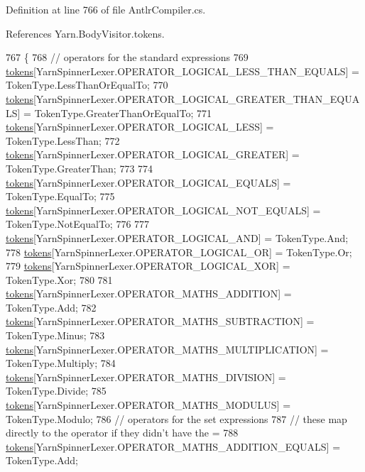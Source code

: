 Definition at line 766 of file Antlr\-Compiler.\-cs.



References Yarn.\-Body\-Visitor.\-tokens.


\begin{DoxyCode}
767         \{
768             \textcolor{comment}{// operators for the standard expressions}
769             \hyperlink{a00038_ab8aa4dbe47a807e3d973df2b85e3fffc}{tokens}[YarnSpinnerLexer.OPERATOR\_LOGICAL\_LESS\_THAN\_EQUALS] = TokenType.LessThanOrEqualTo;
770             \hyperlink{a00038_ab8aa4dbe47a807e3d973df2b85e3fffc}{tokens}[YarnSpinnerLexer.OPERATOR\_LOGICAL\_GREATER\_THAN\_EQUALS] = 
      TokenType.GreaterThanOrEqualTo;
771             \hyperlink{a00038_ab8aa4dbe47a807e3d973df2b85e3fffc}{tokens}[YarnSpinnerLexer.OPERATOR\_LOGICAL\_LESS] = TokenType.LessThan;
772             \hyperlink{a00038_ab8aa4dbe47a807e3d973df2b85e3fffc}{tokens}[YarnSpinnerLexer.OPERATOR\_LOGICAL\_GREATER] = TokenType.GreaterThan;
773 
774             \hyperlink{a00038_ab8aa4dbe47a807e3d973df2b85e3fffc}{tokens}[YarnSpinnerLexer.OPERATOR\_LOGICAL\_EQUALS] = TokenType.EqualTo;
775             \hyperlink{a00038_ab8aa4dbe47a807e3d973df2b85e3fffc}{tokens}[YarnSpinnerLexer.OPERATOR\_LOGICAL\_NOT\_EQUALS] = TokenType.NotEqualTo;
776 
777             \hyperlink{a00038_ab8aa4dbe47a807e3d973df2b85e3fffc}{tokens}[YarnSpinnerLexer.OPERATOR\_LOGICAL\_AND] = TokenType.And;
778             \hyperlink{a00038_ab8aa4dbe47a807e3d973df2b85e3fffc}{tokens}[YarnSpinnerLexer.OPERATOR\_LOGICAL\_OR] = TokenType.Or;
779             \hyperlink{a00038_ab8aa4dbe47a807e3d973df2b85e3fffc}{tokens}[YarnSpinnerLexer.OPERATOR\_LOGICAL\_XOR] = TokenType.Xor;
780 
781             \hyperlink{a00038_ab8aa4dbe47a807e3d973df2b85e3fffc}{tokens}[YarnSpinnerLexer.OPERATOR\_MATHS\_ADDITION] = TokenType.Add;
782             \hyperlink{a00038_ab8aa4dbe47a807e3d973df2b85e3fffc}{tokens}[YarnSpinnerLexer.OPERATOR\_MATHS\_SUBTRACTION] = TokenType.Minus;
783             \hyperlink{a00038_ab8aa4dbe47a807e3d973df2b85e3fffc}{tokens}[YarnSpinnerLexer.OPERATOR\_MATHS\_MULTIPLICATION] = TokenType.Multiply;
784             \hyperlink{a00038_ab8aa4dbe47a807e3d973df2b85e3fffc}{tokens}[YarnSpinnerLexer.OPERATOR\_MATHS\_DIVISION] = TokenType.Divide;
785             \hyperlink{a00038_ab8aa4dbe47a807e3d973df2b85e3fffc}{tokens}[YarnSpinnerLexer.OPERATOR\_MATHS\_MODULUS] = TokenType.Modulo;
786             \textcolor{comment}{// operators for the set expressions}
787             \textcolor{comment}{// these map directly to the operator if they didn't have the =}
788             \hyperlink{a00038_ab8aa4dbe47a807e3d973df2b85e3fffc}{tokens}[YarnSpinnerLexer.OPERATOR\_MATHS\_ADDITION\_EQUALS] = TokenType.Add;

\end{DoxyCode}
